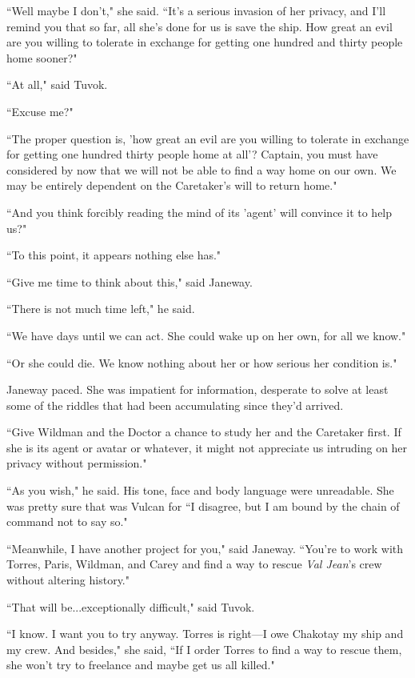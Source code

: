 \documentclass[twoside,letterpaper,12pt]{memoir}
\begin{document}
``Well maybe I don't," she said. ``It's a serious invasion of her privacy, and I'll remind you that so far, all she's done for us is save the ship. How great an evil are you willing to tolerate in exchange for getting one hundred and thirty people home sooner?" 

``At all," said Tuvok. 

``Excuse me?" 

``The proper question is, 'how great an evil are you willing to tolerate in exchange for getting one hundred thirty people home at all'? Captain, you must have considered by now that we will not be able to find a way home on our own. We may be entirely dependent on the Caretaker's will to return home." 

``And you think forcibly reading the mind of its 'agent' will convince it to help us?" 

``To this point, it appears nothing else has." 

``Give me time to think about this," said Janeway. 

``There is not much time left," he said. 

``We have days until we can act. She could wake up on her own, for all we know." 

``Or she could die. We know nothing about her or how serious her condition is." 

Janeway paced. She was impatient for information, desperate to solve at least some of the riddles that had been accumulating since they'd arrived. 

``Give Wildman and the Doctor a chance to study her and the Caretaker first. If she is its agent or avatar or whatever, it might not appreciate us intruding on her privacy without permission." 

``As you wish," he said. His tone, face and body language were unreadable. She was pretty sure that was Vulcan for ``I disagree, but I am bound by the chain of command not to say so." 

``Meanwhile, I have another project for you," said Janeway. ``You're to work with Torres, Paris, Wildman, and Carey and find a way to rescue \textit{Val Jean}'s crew without altering history." 

``That will be...exceptionally difficult," said Tuvok. 

``I know. I want you to try anyway. Torres is right---I owe Chakotay my ship and my crew. And besides," she said, ``If I order Torres to find a way to rescue them, she won't try to freelance and maybe get us all killed." 
\end{document}
